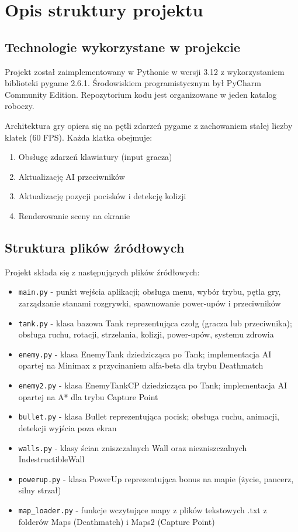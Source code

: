 \chapter{Opis struktury projektu}
\label{cha:Opis struktury projektu}

\section{Technologie wykorzystane w projekcie}

Projekt został zaimplementowany w Pythonie w wersji 3.12 z wykorzystaniem biblioteki pygame 2.6.1. 
Środowiskiem programistycznym był PyCharm Community Edition. Repozytorium kodu jest organizowane w jeden katalog 
roboczy.
 
Architektura gry opiera się na pętli zdarzeń pygame z zachowaniem stałej liczby klatek (60 FPS). Każda klatka obejmuje:
\begin{enumerate}
    \item Obsługę zdarzeń klawiatury (input gracza)
    \item Aktualizację AI przeciwników
    \item Aktualizację pozycji pocisków i detekcję kolizji
    \item Renderowanie sceny na ekranie
\end{enumerate}

\section{Struktura plików źródłowych}

Projekt składa się z następujących plików źródłowych:
 
\begin{itemize}
    \item \texttt{main.py} - punkt wejścia aplikacji; obsługa menu, wybór trybu, pętla gry, 
    zarządzanie stanami rozgrywki, spawnowanie power-upów i przeciwników
    \item \texttt{tank.py} - klasa bazowa Tank reprezentująca czołg (gracza lub przeciwnika); 
    obsługa ruchu, rotacji, strzelania, kolizji, power-upów, systemu zdrowia
    \item \texttt{enemy.py} - klasa EnemyTank dziedzicząca po Tank; implementacja AI opartej 
    na Minimax z przycinaniem alfa-beta dla trybu Deathmatch
    \item \texttt{enemy2.py} - klasa EnemyTankCP dziedzicząca po Tank; implementacja AI opartej 
    na A* dla trybu Capture Point
    \item \texttt{bullet.py} - klasa Bullet reprezentująca pocisk; obsługa ruchu, animacji, detekcji wyjścia poza ekran
    \item \texttt{walls.py} - klasy ścian zniszczalnych Wall oraz niezniszczalnych IndestructibleWall
    \item \texttt{powerup.py} - klasa PowerUp reprezentująca bonus na mapie (życie, pancerz, silny strzał)
    \item \texttt{map\_loader.py} - funkcje wczytujące mapy z plików tekstowych .txt z folderów Maps (Deathmatch) i {Maps2} (Capture Point)
\end{itemize}
 
